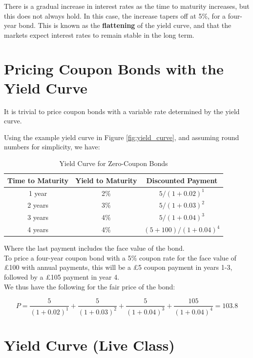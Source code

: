 There is a gradual increase in interest rates as the time to maturity increases, but this does not always hold. In this case, the increase tapers off at 5\%, for a four-year bond. This is known as the \textbf{flattening} of the yield curve, and that the markets expect interest rates to remain stable in the long term.

\section{Pricing Coupon Bonds with the Yield Curve}

It is trivial to price coupon bonds with a variable rate determined by the yield curve. 

Using the example yield curve in Figure \ref{fig:yield_curve}, and assuming round numbers for simplicity, we have:

\begin{table}[htbp]
    \centering
    \caption{Yield Curve for Zero-Coupon Bonds}
    \label{tab:yield_curve}
    \begin{tabular}{@{} c c c @{}}
    \toprule
    \textbf{Time to Maturity} & \textbf{Yield to Maturity} & \textbf{Discounted Payment} \\
    \midrule
    1 year & 2\% & ${5}/{(1+0.02)^1}$\\
    2 years & 3\% & ${5}/{(1+0.03)^2}$\\
    3 years & 4\% & ${5}/{(1+0.04)^3}$\\
    4 years & 4\% & ${(5+100)}/{(1+0.04)^4}$\\  
    \bottomrule
    \end{tabular}
\end{table}

Where the last payment includes the face value of the bond.\\

To price a four-year coupon bond with a 5\% coupon rate for the face value of £100 with annual payments, this will be a £5 coupon payment in years 1-3, followed by a £105 payment in year 4.\\

We thus have the following for the fair price of the bond:

\[
P = \frac{5}{(1+0.02)^1} + \frac{5}{(1+0.03)^2} + \frac{5}{(1+0.04)^3} + \frac{105}{(1+0.04)^4}  = 103.8
\]
\renewcommand{\thesection}{2.6 - 2.8}
\section{Yield Curve (Live Class)}
\setcounter{section}{8}
\renewcommand{\thesection}{\arabic{chapter}.\arabic{section}}

